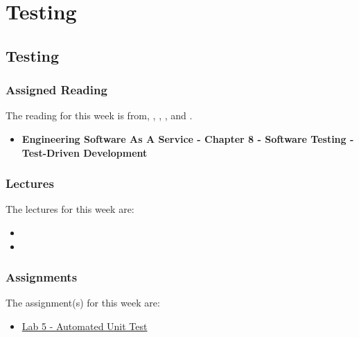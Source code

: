\clearpage

\renewcommand{\ChapTitle}{Testing}
\renewcommand{\SectionTitle}{Testing}

\chapter{\ChapTitle}

\section{\SectionTitle}

\subsection{Assigned Reading}

The reading for this week is from, \AgileBook, \EngSoftBook, \ProGitBook, and \LinuxBook.

\begin{itemize}
    \item \textbf{Engineering Software As A Service - Chapter 8 - Software Testing - Test-Driven Development}
\end{itemize}

\subsection{Lectures}

The lectures for this week are:

\begin{itemize}
    \item {}
    \item {}
\end{itemize}

\subsection{Assignments}

The assignment(s) for this week are:

\begin{itemize}
    \item \href{https://github.com/QuantumCompiler/CU/tree/main/CSPB%203308%20-%20Software%20Development%20Methods%20And%20Tools/Assignments/Assignment%205%20-%20Automated%20Unit%20Test}{Lab 5 - Automated Unit Test}
\end{itemize}

